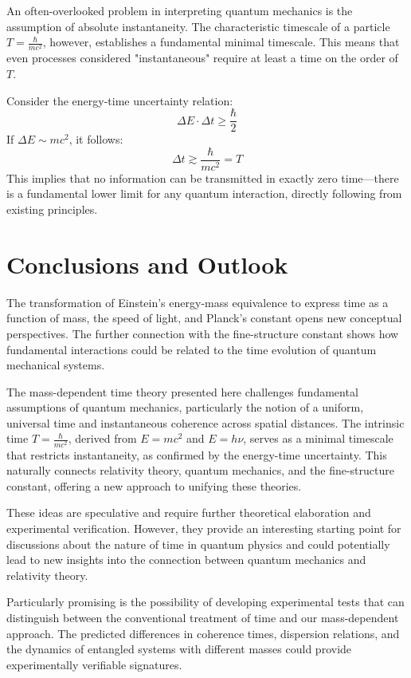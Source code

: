 \documentclass{article}
\begin{document}
	An often-overlooked problem in interpreting quantum mechanics is the assumption of absolute instantaneity. The characteristic timescale of a particle $T = \frac{\hbar}{mc^2}$, however, establishes a fundamental minimal timescale. This means that even processes considered "instantaneous" require at least a time on the order of $T$.
	
	Consider the energy-time uncertainty relation:
	\begin{equation}
		\Delta E \cdot \Delta t \geq \frac{\hbar}{2}
	\end{equation}
	If $\Delta E \sim mc^2$, it follows:
	\begin{equation}
		\Delta t \gtrsim \frac{\hbar}{mc^2} = T
	\end{equation}
	This implies that no information can be transmitted in exactly zero time—there is a fundamental lower limit for any quantum interaction, directly following from existing principles.
	
	\section{Conclusions and Outlook}
	
	The transformation of Einstein's energy-mass equivalence to express time as a function of mass, the speed of light, and Planck's constant opens new conceptual perspectives. The further connection with the fine-structure constant shows how fundamental interactions could be related to the time evolution of quantum mechanical systems.
	
	The mass-dependent time theory presented here challenges fundamental assumptions of quantum mechanics, particularly the notion of a uniform, universal time and instantaneous coherence across spatial distances. The intrinsic time $T = \frac{\hbar}{mc^2}$, derived from $E = mc^2$ and $E = h\nu$, serves as a minimal timescale that restricts instantaneity, as confirmed by the energy-time uncertainty. This naturally connects relativity theory, quantum mechanics, and the fine-structure constant, offering a new approach to unifying these theories.
	
	These ideas are speculative and require further theoretical elaboration and experimental verification. However, they provide an interesting starting point for discussions about the nature of time in quantum physics and could potentially lead to new insights into the connection between quantum mechanics and relativity theory.
	
	Particularly promising is the possibility of developing experimental tests that can distinguish between the conventional treatment of time and our mass-dependent approach. The predicted differences in coherence times, dispersion relations, and the dynamics of entangled systems with different masses could provide experimentally verifiable signatures.
	
\end{document}
